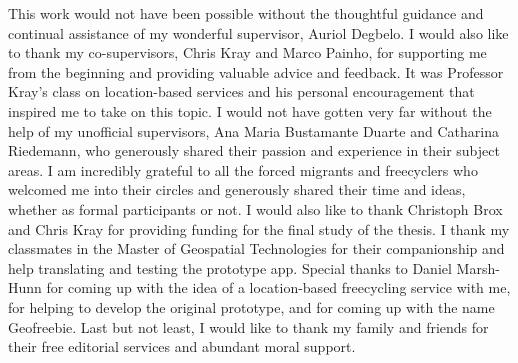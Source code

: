 \cleardoublepage


\begin{acknowledgements}

This work would not have been possible without the thoughtful guidance and continual assistance of my wonderful supervisor, Auriol Degbelo. I would also like to thank my co-supervisors, Chris Kray and Marco Painho, for supporting me from the beginning and providing valuable advice and feedback. It was Professor Kray's class on location-based services and his personal encouragement that inspired me to take on this topic. I would not have gotten very far without the help of my unofficial supervisors, Ana Maria Bustamante Duarte and Catharina Riedemann, who generously shared their passion and experience in their subject areas. I am incredibly grateful to all the forced migrants and freecyclers who welcomed me into their circles and generously shared their time and ideas, whether as formal participants or not. I would also like to thank Christoph Brox and Chris Kray for providing funding for the final study of the thesis. I thank my classmates in the Master of Geospatial Technologies for their companionship and help translating and testing the prototype app. Special thanks to Daniel Marsh-Hunn for coming up with the idea of a location-based freecycling service with me, for helping to develop the original prototype, and for coming up with the name Geofreebie. Last but not least, I would like to thank my family and friends for their free editorial services and abundant moral support.

\end{acknowledgements}